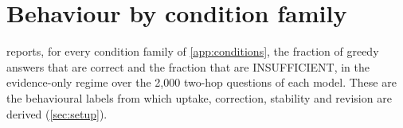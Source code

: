 \section{Behaviour by condition family}
\label{app:behaviour}
 reports, for every condition family of \cref{app:conditions}, the fraction of greedy answers that are correct and the fraction that are INSUFFICIENT, in the evidence-only regime over the 2{,}000 two-hop questions of each model. These are the behavioural labels from which uptake, correction, stability and revision are derived (\cref{sec:setup}).
\begin{table}[h]
\centering\small

\caption{Behaviour by condition family (evidence-only regime, 2{,}000 questions per model): fraction correct / fraction answering INSUFFICIENT.}
\label{tab:behaviour}
\end{table}
